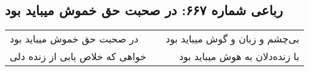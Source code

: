 \begin{center}
\section*{رباعی شماره ۶۶۷: در صحبت حق خموش میباید بود}
\label{sec:0667}
\begin{longtable}{l p{0.5cm} r}
در صحبت حق خموش میباید بود
&&
بی‌چشم و زبان و گوش میباید بود
\\
خواهی که خلاص یابی از زنده دلی
&&
با زنده‌دلان به هوش میباید بود
\\
\end{longtable}
\end{center}

